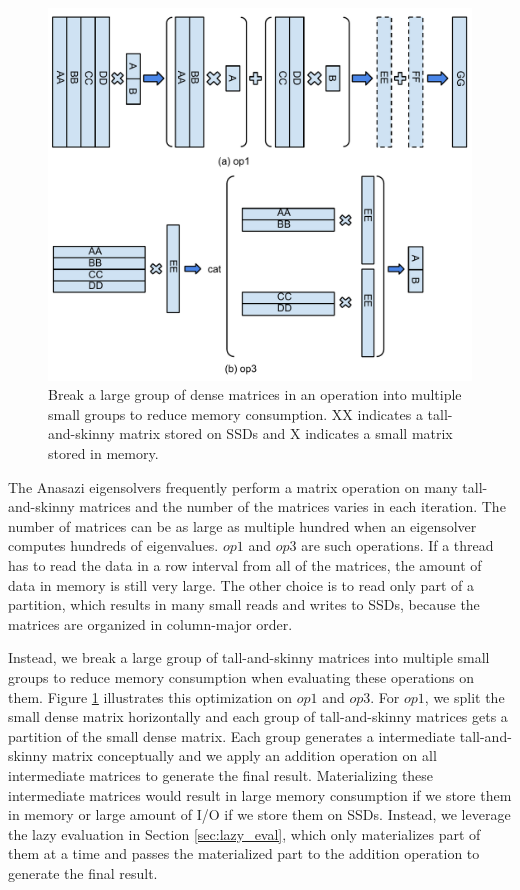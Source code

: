 \begin{figure}
\centering
\includegraphics[scale=0.4]{./mat_group.pdf}
\vspace{-5pt}
\caption{Break a large group of dense matrices in an operation into multiple
small groups to reduce memory consumption. XX indicates a tall-and-skinny matrix
stored on SSDs and X indicates a small matrix stored in memory.}
\vspace{-5pt}
\label{fig:mat_group}
\end{figure}

The Anasazi eigensolvers frequently perform a matrix operation on many
tall-and-skinny matrices and the number of the matrices varies in each iteration.
The number of matrices can be as large as multiple hundred when an eigensolver
computes hundreds of eigenvalues. $op1$ and $op3$ are such operations.
If a thread has to read the data in a row interval from all of the matrices,
the amount of data in memory is still very large. The other choice is to read
only part of a partition, which results in many small reads and writes to SSDs,
because the matrices are organized in column-major order.

Instead, we break a large group of tall-and-skinny matrices into multiple small
groups to reduce
memory consumption when evaluating these operations on them. Figure
\ref{fig:mat_group} illustrates this optimization on $op1$ and $op3$. For $op1$,
we split the small dense matrix horizontally and each group of tall-and-skinny
matrices gets a partition of the small dense matrix. Each group generates
a intermediate tall-and-skinny matrix conceptually and we apply an addition
operation on all intermediate matrices to generate the final result.
Materializing these
intermediate matrices would result in large memory consumption if we store them
in memory or large amount of I/O if we store them on SSDs. Instead, we leverage
the lazy evaluation in Section \ref{sec:lazy_eval}, which only materializes
part of them at a time and passes the materialized part to the addition operation
to generate the final result.

